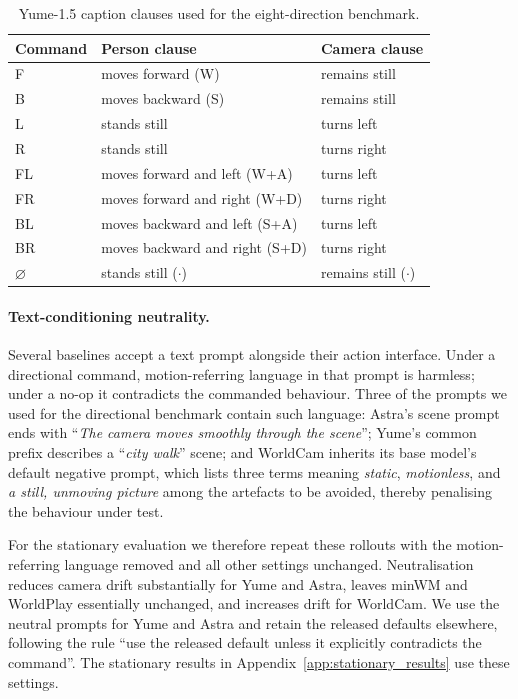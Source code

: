 \documentclass[letterpaper]{article} %
\begin{document}
\begin{table}[t]
\centering
{
\small
\begin{tabular}{lll}
\toprule
Command & Person clause & Camera clause \\
\midrule
F  & moves forward (W)              & remains still \\
B  & moves backward (S)             & remains still \\
L  & stands still                   & turns left \\
R  & stands still                   & turns right \\
FL & moves forward and left (W+A)   & turns left \\
FR & moves forward and right (W+D)  & turns right \\
BL & moves backward and left (S+A)  & turns left \\
BR & moves backward and right (S+D) & turns right \\
$\varnothing$ & stands still ($\cdot$) & remains still ($\cdot$) \\
\bottomrule
\end{tabular}
}
\caption{
    Yume-1.5 caption clauses used for the eight-direction benchmark.
}
\label{tab:yume_commands}
\end{table}

\paragraph{Text-conditioning neutrality.}
Several baselines accept a text prompt alongside their action interface. Under
a directional command, motion-referring language in that prompt is harmless;
under a no-op it contradicts the commanded behaviour. Three of the prompts we
used for the directional benchmark contain such language: Astra's scene prompt
ends with ``\emph{The camera moves smoothly through the scene}''; Yume's
common prefix describes a ``\emph{city walk}'' scene; and WorldCam inherits
its base model's default negative prompt, which lists three terms meaning
\emph{static}, \emph{motionless}, and \emph{a still, unmoving picture} among
the artefacts to be avoided, thereby penalising the behaviour under test.

For the stationary evaluation we therefore repeat these rollouts with the
motion-referring language removed and all other settings unchanged.
Neutralisation reduces camera drift substantially for Yume and Astra, leaves
minWM and WorldPlay essentially unchanged, and increases drift for WorldCam.
We use the neutral prompts for Yume and Astra and retain the released defaults
elsewhere, following the rule ``use the released default unless it explicitly
contradicts the command''. The stationary results in
Appendix~\ref{app:stationary_results} use these settings.
\end{document}
